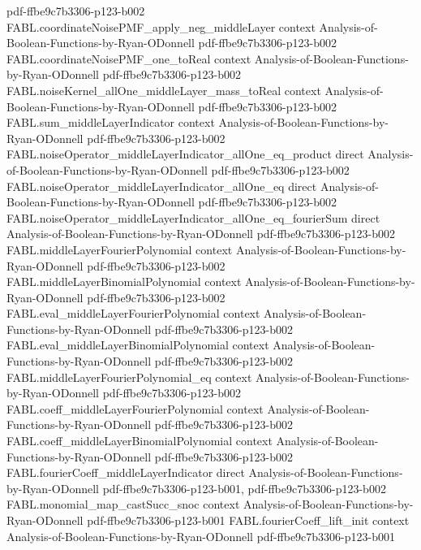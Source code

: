 \begin{theorem}
  {pdf-ffbe9c7b3306-p123-b002}
\proofstep
  {FABL.coordinateNoisePMF_apply_neg_middleLayer}
  {context}
  {Analysis-of-Boolean-Functions-by-Ryan-ODonnell}
  {pdf-ffbe9c7b3306-p123-b002}
\proofstep
  {FABL.coordinateNoisePMF_one_toReal}
  {context}
  {Analysis-of-Boolean-Functions-by-Ryan-ODonnell}
  {pdf-ffbe9c7b3306-p123-b002}
\proofstep
  {FABL.noiseKernel_allOne_middleLayer_mass_toReal}
  {context}
  {Analysis-of-Boolean-Functions-by-Ryan-ODonnell}
  {pdf-ffbe9c7b3306-p123-b002}
\proofstep
  {FABL.sum_middleLayerIndicator}
  {context}
  {Analysis-of-Boolean-Functions-by-Ryan-ODonnell}
  {pdf-ffbe9c7b3306-p123-b002}
\proofstep
  {FABL.noiseOperator_middleLayerIndicator_allOne_eq_product}
  {direct}
  {Analysis-of-Boolean-Functions-by-Ryan-ODonnell}
  {pdf-ffbe9c7b3306-p123-b002}
\proofstep
  {FABL.noiseOperator_middleLayerIndicator_allOne_eq}
  {direct}
  {Analysis-of-Boolean-Functions-by-Ryan-ODonnell}
  {pdf-ffbe9c7b3306-p123-b002}
\proofstep
  {FABL.noiseOperator_middleLayerIndicator_allOne_eq_fourierSum}
  {direct}
  {Analysis-of-Boolean-Functions-by-Ryan-ODonnell}
  {pdf-ffbe9c7b3306-p123-b002}
\proofstep
  {FABL.middleLayerFourierPolynomial}
  {context}
  {Analysis-of-Boolean-Functions-by-Ryan-ODonnell}
  {pdf-ffbe9c7b3306-p123-b002}
\proofstep
  {FABL.middleLayerBinomialPolynomial}
  {context}
  {Analysis-of-Boolean-Functions-by-Ryan-ODonnell}
  {pdf-ffbe9c7b3306-p123-b002}
\proofstep
  {FABL.eval_middleLayerFourierPolynomial}
  {context}
  {Analysis-of-Boolean-Functions-by-Ryan-ODonnell}
  {pdf-ffbe9c7b3306-p123-b002}
\proofstep
  {FABL.eval_middleLayerBinomialPolynomial}
  {context}
  {Analysis-of-Boolean-Functions-by-Ryan-ODonnell}
  {pdf-ffbe9c7b3306-p123-b002}
\proofstep
  {FABL.middleLayerFourierPolynomial_eq}
  {context}
  {Analysis-of-Boolean-Functions-by-Ryan-ODonnell}
  {pdf-ffbe9c7b3306-p123-b002}
\proofstep
  {FABL.coeff_middleLayerFourierPolynomial}
  {context}
  {Analysis-of-Boolean-Functions-by-Ryan-ODonnell}
  {pdf-ffbe9c7b3306-p123-b002}
\proofstep
  {FABL.coeff_middleLayerBinomialPolynomial}
  {context}
  {Analysis-of-Boolean-Functions-by-Ryan-ODonnell}
  {pdf-ffbe9c7b3306-p123-b002}
\proofstep
  {FABL.fourierCoeff_middleLayerIndicator}
  {direct}
  {Analysis-of-Boolean-Functions-by-Ryan-ODonnell}
  {pdf-ffbe9c7b3306-p123-b001,
    pdf-ffbe9c7b3306-p123-b002}
\proofstep
  {FABL.monomial_map_castSucc_snoc}
  {context}
  {Analysis-of-Boolean-Functions-by-Ryan-ODonnell}
  {pdf-ffbe9c7b3306-p123-b001}
\proofstep
  {FABL.fourierCoeff_lift_init}
  {context}
  {Analysis-of-Boolean-Functions-by-Ryan-ODonnell}
  {pdf-ffbe9c7b3306-p123-b001}

\end{theorem}

